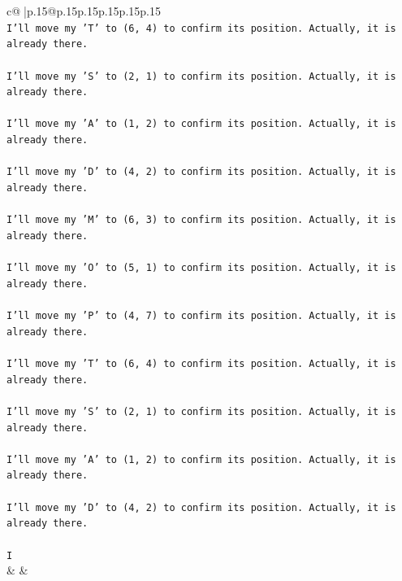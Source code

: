 \documentclass{article}
\begin{document}
{\begin{supertabular}{c@{$\;$}|p{.15\linewidth}@{}p{.15\linewidth}p{.15\linewidth}p{.15\linewidth}p{.15\linewidth}p{.15\linewidth}}
{{{\\ 
\texttt{I'll move my 'T' to (6, 4) to confirm its position. Actually, it is already there.} \\
\\ 
\texttt{I'll move my 'S' to (2, 1) to confirm its position. Actually, it is already there.} \\
\\ 
\texttt{I'll move my 'A' to (1, 2) to confirm its position. Actually, it is already there.} \\
\\ 
\texttt{I'll move my 'D' to (4, 2) to confirm its position. Actually, it is already there.} \\
\\ 
\texttt{I'll move my 'M' to (6, 3) to confirm its position. Actually, it is already there.} \\
\\ 
\texttt{I'll move my 'O' to (5, 1) to confirm its position. Actually, it is already there.} \\
\\ 
\texttt{I'll move my 'P' to (4, 7) to confirm its position. Actually, it is already there.} \\
\\ 
\texttt{I'll move my 'T' to (6, 4) to confirm its position. Actually, it is already there.} \\
\\ 
\texttt{I'll move my 'S' to (2, 1) to confirm its position. Actually, it is already there.} \\
\\ 
\texttt{I'll move my 'A' to (1, 2) to confirm its position. Actually, it is already there.} \\
\\ 
\texttt{I'll move my 'D' to (4, 2) to confirm its position. Actually, it is already there.} \\
\\ 
\texttt{I} \\
            }
        }
    }
    & & \\ \\


\end{supertabular}}
\end{document}
